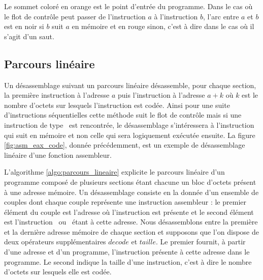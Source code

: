 Le sommet coloré en orange est le point d'entrée du programme. Dans le cas où le flot de contrôle peut passer de l'instruction $a$ à l'instruction $b$, l'arc entre $a$ et $b$ est en noir si $b$ suit $a$ en mémoire et en rouge sinon, c'est à dire dans le cas où il s'agit d'un saut.

\FloatBarrier
\subsection{Parcours linéaire}
Un désassemblage suivant un parcours linéaire désassemble, pour chaque section, la première instruction à l'adresse $a$ puis l'instruction à l'adresse $a+k$ où $k$ est le nombre d'octets sur lesquels l'instruction est codée.
Ainsi pour une suite d'instructions séquentielles cette méthode suit le flot de contrôle mais si une instruction de type \jmp\ est rencontrée, le désassemblage s'intéressera à l'instruction qui suit en mémoire et non celle qui sera logiquement exécutée ensuite.
La figure \ref{fig:asm_eax_code}, donnée précédemment, est un exemple de désassemblage linéaire d'une fonction assembleur.

L'algorithme \ref{algo:parcours_lineaire} explicite le parcours linéaire d'un programme composé de plusieurs sections étant chacune un bloc d'octets présent à une adresse mémoire.
Un désassemblage consiste en la donnée d'un ensemble de couples dont chaque couple représente une instruction assembleur : le premier élément du couple est l'adresse où l'instruction est présente et le second élément est l'instruction \xq\ ou \xs\ étant à cette adresse.
Nous désassemblons entre la première et la dernière adresse mémoire de chaque section et supposons que l'on dispose de deux opérateurs supplémentaires $decode$ et $taille$.
Le premier fournit, à partir d'une adresse et d'un programme, l'instruction présente à cette adresse dans le programme.
Le second indique la taille d'une instruction, c'est à dire le nombre d'octets sur lesquels elle est codée.

